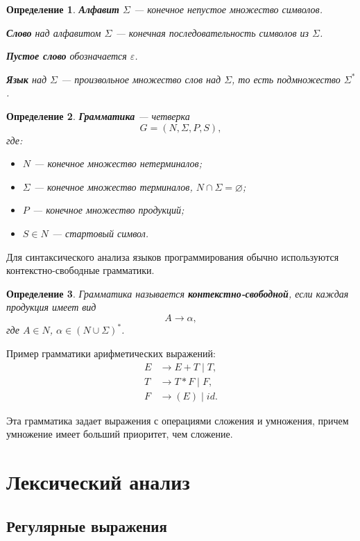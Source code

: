 \documentclass[12pt,a4paper]{article}
\newtheorem{definition}{Определение}
\begin{document}
\begin{definition}
\textbf{Алфавит} $\Sigma$ --- конечное непустое множество символов.

\textbf{Слово} над алфавитом $\Sigma$ --- конечная последовательность символов из $\Sigma$.

\textbf{Пустое слово} обозначается $\varepsilon$.

\textbf{Язык} над $\Sigma$ --- произвольное множество слов над $\Sigma$, то есть подмножество $\Sigma^*$.
\end{definition}

\begin{definition}
\textbf{Грамматика} --- четверка
\[
G = (N, \Sigma, P, S),
\]
где:
\begin{itemize}
    \item $N$ --- конечное множество нетерминалов;
    \item $\Sigma$ --- конечное множество терминалов, $N \cap \Sigma = \varnothing$;
    \item $P$ --- конечное множество продукций;
    \item $S \in N$ --- стартовый символ.
\end{itemize}
\end{definition}

Для синтаксического анализа языков программирования обычно используются контекстно-свободные грамматики.

\begin{definition}
Грамматика называется \textbf{контекстно-свободной}, если каждая продукция имеет вид
\[
A \to \alpha,
\]
где $A \in N$, $\alpha \in (N \cup \Sigma)^*$.
\end{definition}

Пример грамматики арифметических выражений:
\[
\begin{aligned}
E &\to E + T \mid T,\\
T &\to T * F \mid F,\\
F &\to (E) \mid id.
\end{aligned}
\]

Эта грамматика задает выражения с операциями сложения и умножения, причем умножение имеет больший приоритет, чем сложение.

\section{Лексический анализ}

\subsection{Регулярные выражения}
\end{document}
